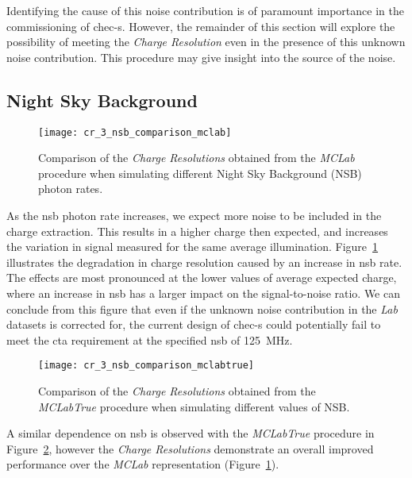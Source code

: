 Identifying the cause of this noise contribution is of paramount importance in the commissioning of \gls{chec-s}. However, the remainder of this section will explore the possibility of meeting the \textit{Charge Resolution} even in the presence of this unknown noise contribution. This procedure may give insight into the source of the noise.

\subsection{Night Sky Background}

\begin{figure}[H]
	\centering
    \texttt{[image: cr\_3\_nsb\_comparison\_mclab]} 
	\caption[Comparison of the \textit{Charge Resolution} at different NSBs.]{Comparison of the \textit{Charge Resolutions} obtained from the \textit{MCLab} procedure when simulating different Night Sky Background (NSB) photon rates.}
	\label{fig:cr_3_nsb_comparison_mclab}
\end{figure}

As the \gls{nsb} photon rate increases, we expect more noise to be included in the charge extraction. This results in a higher charge then expected, and increases the variation in signal measured for the same average illumination. Figure~\ref{fig:cr_3_nsb_comparison_mclab} illustrates the degradation in charge resolution caused by an increase in \gls{nsb} rate. The effects are most pronounced at the lower values of average expected charge, where an increase in \gls{nsb} has a larger impact on the signal-to-noise ratio. We can conclude from this figure that even if the unknown noise contribution in the \textit{Lab} datasets is corrected for, the current design of \gls{chec-s} could potentially fail to meet the \gls{cta} requirement at the specified \gls{nsb} of \SI{125}{MHz}.

\begin{figure}
	\centering
    \texttt{[image: cr\_3\_nsb\_comparison\_mclabtrue]} 
	\caption[Comparison of the \textit{Charge Resolution} at different NSBs using the \textit{MCLabTrue} procedure.]{Comparison of the \textit{Charge Resolutions} obtained from the \textit{MCLabTrue} procedure when simulating different values of NSB.}
	\label{fig:cr_3_nsb_comparison_mclabtrue}
\end{figure}

A similar dependence on \gls{nsb} is observed with the \textit{MCLabTrue} procedure in Figure~\ref{fig:cr_3_nsb_comparison_mclabtrue}, however the \textit{Charge Resolutions} demonstrate an overall improved performance over the \textit{MCLab} representation (Figure~\ref{fig:cr_3_nsb_comparison_mclab}).


